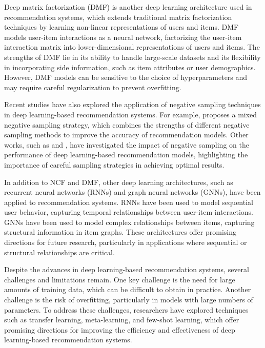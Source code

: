 \documentclass[11pt,a4paper]{article}
\begin{document}
Deep matrix factorization (DMF) \cite{doi:10.1145/3366424.3386195} is another deep learning architecture used in recommendation systems, which extends traditional matrix factorization techniques by learning non-linear representations of users and items. DMF models user-item interactions as a neural network, factorizing the user-item interaction matrix into lower-dimensional representations of users and items. The strengths of DMF lie in its ability to handle large-scale datasets and its flexibility in incorporating side information, such as item attributes or user demographics. However, DMF models can be sensitive to the choice of hyperparameters and may require careful regularization to prevent overfitting.

Recent studies have also explored the application of negative sampling techniques in deep learning-based recommendation systems. For example, \cite{doi:10.1145/3366424.3386195} proposes a mixed negative sampling strategy, which combines the strengths of different negative sampling methods to improve the accuracy of recommendation models. Other works, such as \cite{doi:10.1145/3097983.3098202} and \cite{doi:10.1145/3366423.3380303}, have investigated the impact of negative sampling on the performance of deep learning-based recommendation models, highlighting the importance of careful sampling strategies in achieving optimal results.

In addition to NCF and DMF, other deep learning architectures, such as recurrent neural networks (RNNs) and graph neural networks (GNNs), have been applied to recommendation systems. RNNs have been used to model sequential user behavior, capturing temporal relationships between user-item interactions. GNNs have been used to model complex relationships between items, capturing structural information in item graphs. These architectures offer promising directions for future research, particularly in applications where sequential or structural relationships are critical.

Despite the advances in deep learning-based recommendation systems, several challenges and limitations remain. One key challenge is the need for large amounts of training data, which can be difficult to obtain in practice. Another challenge is the risk of overfitting, particularly in models with large numbers of parameters. To address these challenges, researchers have explored techniques such as transfer learning, meta-learning, and few-shot learning, which offer promising directions for improving the efficiency and effectiveness of deep learning-based recommendation systems.
\end{document}

